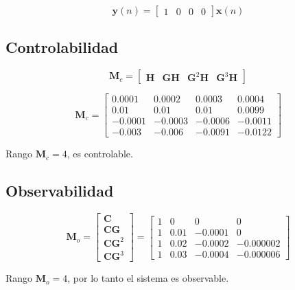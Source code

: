 \[
\mathbf{y}(n) = \begin{bmatrix} 1 & 0 & 0 & 0 \end{bmatrix} \mathbf{x}(n)
\]

\subsection{Controlabilidad}

\[
\mathbf{M}_c = \begin{bmatrix} \mathbf{H} & \mathbf{G}\mathbf{H} & \mathbf{G}^2\mathbf{H} & \mathbf{G}^3\mathbf{H} \end{bmatrix}
\]

\[
\mathbf{M}_c = \begin{bmatrix} 0.0001 & 0.0002 & 0.0003 & 0.0004 \\ 0.01 & 0.01 & 0.01 & 0.0099 \\ -0.0001 & -0.0003 & -0.0006 & -0.0011 \\ -0.003 & -0.006 & -0.0091 & -0.0122 \end{bmatrix}
\]

Rango $\mathbf{M}_c = 4$, es controlable.

\subsection{Observabilidad}

\[
\mathbf{M}_o = \begin{bmatrix} \mathbf{C} \\ \mathbf{C}\mathbf{G} \\ \mathbf{C}\mathbf{G}^2 \\ \mathbf{C}\mathbf{G}^3 \end{bmatrix}
= \begin{bmatrix}
1 & 0 & 0 & 0 \\
1 & 0.01 & -0.0001 & 0 \\
1 & 0.02 & -0.0002 & -0.000002 \\
1 & 0.03 & -0.0004 & -0.000006
\end{bmatrix}
\]

Rango $\mathbf{M}_o = 4$, por lo tanto el sistema es observable.
